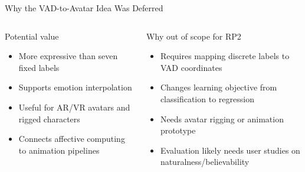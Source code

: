 \documentclass[aspectratio=169,10pt]{beamer}
\newcommand{\keytake}[1]{\vspace{0.3em}{\small #1}}
\begin{document}
\begin{frame}[t]{Why the VAD-to-Avatar Idea Was Deferred}
\begin{columns}[T,onlytextwidth]
\begin{block}{Potential value}
\begin{itemize}
  \item More expressive than seven fixed labels
  \item Supports emotion interpolation
  \item Useful for AR/VR avatars and rigged characters
  \item Connects affective computing to animation pipelines
\end{itemize}
\end{block}
\begin{alertblock}{Why out of scope for RP2}
\begin{itemize}
  \item Requires mapping discrete labels to VAD coordinates
  \item Changes learning objective from classification to regression
  \item Needs avatar rigging or animation prototype
  \item Evaluation likely needs user studies on naturalness/believability
\end{itemize}
\end{alertblock}
\end{columns}
\vspace{0.25cm}
\keytake{We deferred this to keep RP2 to one measurable question: does cross-modal attention improve Egyptian Arabic emotion recognition?}
\end{frame}
\end{document}
